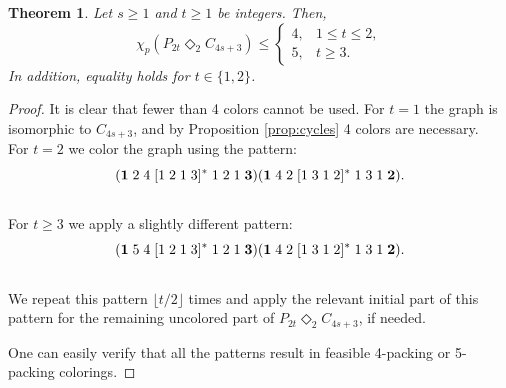 \documentclass{article}
\newtheorem{theorem}{Theorem}
\begin{document}

\begin{theorem}
    Let $s\geq 1$ and $t\geq 1$ be integers. Then,
    $$\chi_p(P_{2t}\Diamond_2 C_{4s+3})\leq\left\{
\begin{array}{ll}
4, & 1 \leq t \leq 2,\\
5, & t\geq 3.
\end{array}\right.
$$
In addition, equality holds for $t\in\{1,2\}$.
\end{theorem}
\begin{proof}
    It is clear that fewer than 4 colors cannot be used. For $t=1$ the graph is isomorphic to $C_{4s+3}$, and by Proposition \ref{prop:cycles} 4 colors are necessary. 
    \\For $t=2$ we color the graph using the pattern:
    $$({\bf 1}\; 2\;4\;[1\;2\;1\;3]^*\;1\;2\;1\;{\bf 3})({\bf 1}\; 4\; 2\;[1\;3\;1\;2]^*\;1\;3\;1\;{\bf 2}).$$
    \\For $t\geq 3$ we apply a slightly different pattern:
    $$({\bf 1}\; 5\;4\;[1\;2\;1\;3]^*\;1\;2\;1\;{\bf 3})({\bf 1}\; 4\; 2\;[1\;3\;1\;2]^*\;1\;3\;1\;{\bf 2}).$$
    \\We repeat this pattern $\lfloor t/2 \rfloor$ times and apply the relevant initial part of this pattern for the remaining uncolored part of $P_{2t}\Diamond_2 C_{4s+3}$, if needed.

    One can easily verify that all the patterns result in feasible 4-packing or 5-packing colorings. 
\end{proof}

\end{document}
